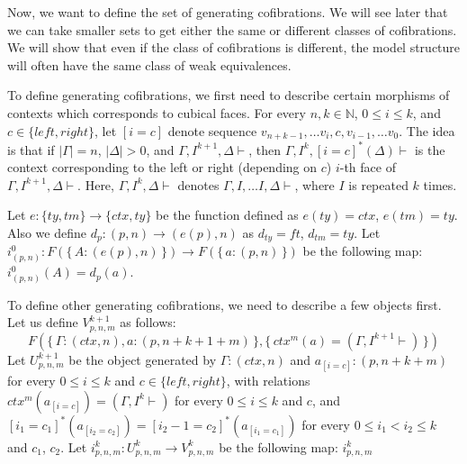 \documentclass[reqno]{amsart}
\theoremstyle{definition}
\theoremstyle{remark}
\numberwithin{figure}{section}
\begin{document}
Now, we want to define the set of generating cofibrations.
We will see later that we can take smaller sets to get either the same or different classes of cofibrations.
We will show that even if the class of cofibrations is different,
the model structure will often have the same class of weak equivalences.

To define generating cofibrations, we first need to describe certain morphisms of contexts which corresponds to cubical faces.
For every $n,k \in \mathbb{N}$, $0 \leq i \leq k$, and $c \in \{ left, right \}$, let $[i = c]$ denote sequence $v_{n+k-1}, \ldots v_i, c, v_{i-1}, \ldots v_0$.
The idea is that if $|\Gamma| = n$, $|\Delta| > 0$, and $\Gamma, I^{k+1}, \Delta \vdash$, then $\Gamma, I^k, [i = c]^*(\Delta) \vdash$
is the context corresponding to the left or right (depending on $c$) $i$-th face of $\Gamma, I^{k+1}, \Delta \vdash$.
Here, $\Gamma, I^k, \Delta \vdash$ denotes $\Gamma, I, \ldots I, \Delta \vdash$, where $I$ is repeated $k$ times.

Let $e : \{ ty, tm \} \to \{ ctx, ty \}$ be the function defined as $e(ty) = ctx$, $e(tm) = ty$.
Also we define $d_p : (p,n) \to (e(p),n)$ as $d_{ty} = ft$, $d_{tm} = ty$.
Let $i^0_{(p,n)} : F(\{\,A : (e(p),n)\,\}) \to F(\{\,a : (p,n)\,\})$ be the following map: $i^0_{(p,n)}(A) = d_p(a)$.

To define other generating cofibrations, we need to describe a few objects first.
Let us define $V^{k+1}_{p,n,m}$ as follows:
\[ F(\{\,\Gamma : (ctx,n), a : (p,n+k+1+m)\,\}, \{\,ctx^m(a) = (\Gamma, I^{k+1} \vdash)\,\}) \]
Let $U^{k+1}_{p,n,m}$ be the object generated by $\Gamma : (ctx,n)$ and $a_{[i = c]} : (p,n+k+m)$ for every $0 \leq i \leq k$ and $c \in \{ left, right \}$,
with relations $ctx^m(a_{[i = c]}) = (\Gamma, I^k \vdash)$ for every $0 \leq i \leq k$ and $c$,
and $[i_1 = c_1]^*(a_{[i_2 = c_2]}) = [i_2 - 1 = c_2]^*(a_{[i_1 = c_1]})$ for every $0 \leq i_1 < i_2 \leq k$ and $c_1$, $c_2$.
Let $i^k_{p,n,m} : U^k_{p,n,m} \to V^k_{p,n,m}$ be the following map: $i^k_{p,n,m}$
\end{document}
